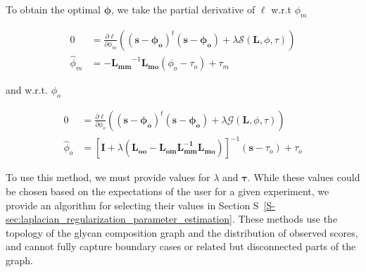         To obtain the optimal $\mathbf{\phi}$, we take the partial
        derivative of $\ell$ w.r.t $\phi_m$

        \begin{align}
            0 &= \frac{\partial\ell}{\partial\phi_m}\left((\mathbf{s} - \mathbf{\phi_o})^t(\mathbf{s} - \mathbf{\phi_o}) + \lambda
                \mathcal{S}(\mathbf{L}, \phi, \tau)\right)\\
            {\hat \phi_m} &= -\mathbf{L_{mm}}^{-1}\mathbf{L_{mo}}(\phi_o - \tau_o) + \tau_m
            \label{eqn:estimate_of_phi_m}
        \end{align}

        \noindent and w.r.t. $\phi_o$

        \begin{align}
            0 &= \frac{\partial\ell}{\partial\phi_o}\left((\mathbf{s} - \mathbf{\phi_o}
                )^t(\mathbf{s} - \mathbf{\phi_o}) + \lambda
                \mathcal{G}(\mathbf{L}, \phi, \tau)\right)\\
            {\hat \phi_o} &= \left[
                \mathbf{I} + \lambda\left(\mathbf{L_{oo}} -
                    \mathbf{L_{om}}\mathbf{L_{mm}^{-1}}\mathbf{L_{mo}}
                \right)
            \right]^{-1}(\mathbf{s} - \tau_o) + \tau_o
            \label{eqn:estimate_of_phi_o}
        \end{align}

        To use this method, we must provide values for $\lambda$ and $\mathbf{\tau}$.
        While these values could be chosen based on the expectations of the user for
        a given experiment, we provide an algorithm for selecting their values in Section
        S~\ref{S-sec:laplacian_regularization_parameter_estimation}.
        These methods use the topology of the glycan composition graph and the
        distribution of observed scores, and cannot fully capture boundary cases
        or related but disconnected parts of the graph.
